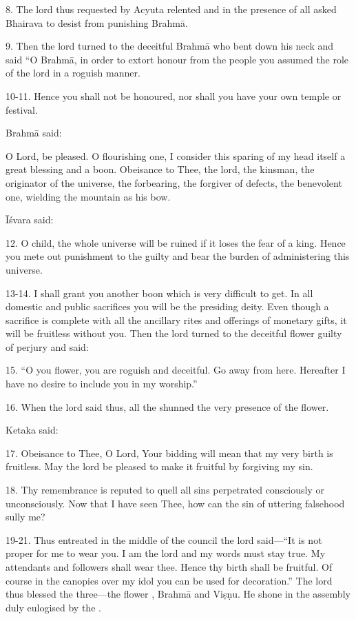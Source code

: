 8. The lord thus requested by Acyuta relented and in the presence of all
 asked Bhairava to desist from punishing Brahmā.

9. Then the lord turned to the deceitful Brahmā who bent down his neck and said
“O Brahmā, in order to extort honour from the people you assumed the role of
the lord in a roguish manner.

10-11. Hence you shall not be honoured, nor shall you have your own temple or festival.

Brahmā said:

O Lord, be pleased. O flourishing one, I consider this sparing of my head itself
a great blessing and a boon. Obeisance to Thee, the lord, the kinsman,
the originator of the universe, the forbearing, the forgiver of defects,
the benevolent one, wielding the mountain as his bow.

Īśvara said:

12. O child, the whole universe will be ruined if it loses the fear of a king.
Hence you mete out punishment to the guilty and bear the burden of administering
this universe.

13-14. I shall grant you another boon which is very difficult to get. In all
domestic and public sacrifices you will be the presiding deity. Even though
a sacrifice is complete with all the ancillary rites and offerings of monetary
gifts, it will be fruitless without you. Then the lord turned to the deceitful
 flower guilty of perjury and said:

15. “O you  flower, you are roguish and deceitful. Go away from here.
Hereafter I have no desire to include you in my worship.”

16. When the lord said thus, all the  shunned the very presence of
the flower.

Ketaka said:

17. Obeisance to Thee, O Lord, Your bidding will mean that my very birth is
fruitless. May the lord be pleased to make it fruitful by forgiving my sin.

18. Thy remembrance is reputed to quell all sins perpetrated consciously or
unconsciously. Now that I have seen Thee, how can the sin of uttering falsehood
sully me?

19-21. Thus entreated in the middle of the council the lord said—“It is not
proper for me to wear you. I am the lord and my words must stay true. My
attendants and followers shall wear thee. Hence thy birth shall be fruitful.
Of course in the canopies over my idol you can be used for decoration.” The lord
thus blessed the three—the flower , Brahmā and Viṣṇu. He shone in
the assembly duly eulogised by the .
